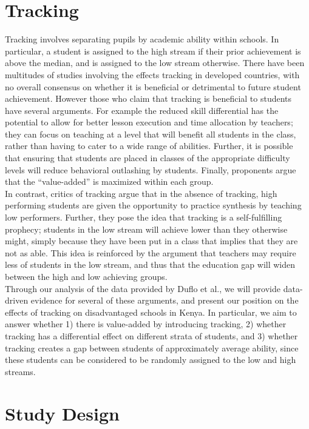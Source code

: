 \documentclass[11pt]{article}
\begin{document}
 \section{Tracking}
Tracking involves separating pupils by academic ability within schools. In particular, a student is assigned to the high stream if their prior achievement is above the median, and is assigned to the low stream otherwise. There have been multitudes of studies involving the effects tracking in developed countries, with no overall consensus on whether it is beneficial or detrimental to future student achievement. However those who claim that tracking is beneficial to students have several arguments. For example the reduced skill differential has the potential to allow for better lesson execution and time allocation by teachers; they can focus on teaching at a level that will benefit all students in the class, rather than having to cater to a wide range of abilities. Further, it is possible that ensuring that students are placed in classes of the appropriate difficulty levels will reduce behavioral outlashing by students. Finally, proponents argue that the ``value-added'' is maximized within each group.\\
In contrast, critics of tracking argue that in the absence of tracking, high performing students are given the opportunity to practice synthesis by teaching low performers. Further, they pose the idea that tracking is a self-fulfilling prophecy; students in the low stream will achieve lower than they otherwise might, simply because they have been put in a class that implies that they are not as able. This idea is reinforced by the argument that teachers may require less of students in the low stream, and thus that the education gap will widen between the high and low achieving groups.\\
Through our analysis of the data provided by Duflo et al., we will provide data-driven evidence for several of these arguments, and present our position on the effects of tracking on disadvantaged schools in Kenya. In particular, we aim to answer whether 1) there is value-added by introducing tracking, 2) whether tracking has a differential effect on different strata of students, and 3) whether tracking creates a gap between students of approximately average ability, since these students can be considered to be randomly assigned to the low and high streams.
 
 \section{Study Design}
 
\end{document}
